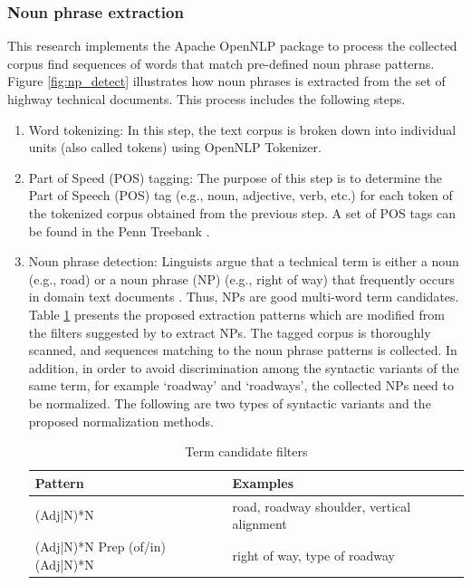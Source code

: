 \documentclass[Journal,InsideFigs, DoubleSpace]{ascelike} %
\begin{document}
\subsubsection{Noun phrase extraction}
%
This research implements the Apache OpenNLP package to process the collected corpus find sequences of words that match pre-defined noun phrase patterns. Figure \ref{fig:np_detect} illustrates how noun phrases is extracted from the set of highway technical documents. This process includes the following steps. %
\begin{enumerate} [label=\roman*]
\item Word tokenizing: In this step, the text corpus is broken down into individual units (also called tokens) using OpenNLP Tokenizer.
\item Part of Speed (POS) tagging: The purpose of this step is to determine the Part of Speech (POS) tag (e.g., noun, adjective, verb, etc.) for each token of the tokenized corpus obtained from the previous step. A set of POS tags can be found in the Penn Treebank \cite{marcus93}.
\item Noun phrase detection: Linguists argue that a technical term is either a noun (e.g., road) or a noun phrase (NP) (e.g., right of way) that frequently occurs in domain text documents \cite{justeson95}. Thus, NPs are good multi-word term candidates. Table \ref{table:term_filter} presents the proposed extraction patterns which are modified from the filters suggested by  to extract NPs. The tagged corpus is thoroughly scanned, and sequences matching to the noun phrase patterns is collected. 
In addition, in order to avoid discrimination among the syntactic variants of the same term, for example `roadway' and `roadways', the collected NPs need to be normalized. The following are two types of syntactic variants and the proposed normalization methods.
\begin{table} [t]
		\caption{Term candidate filters}
		\label{table:term_filter}
		\centering
		\small
		\renewcommand{\arraystretch}{1.25}
		\begin{tabular}{l l}
			\hline
			\textbf{Pattern} & \textbf{Examples}\\
			\hline
			(Adj|N)*N		& road, roadway shoulder, vertical alignment\\
			(Adj|N)*N Prep (of/in) (Adj|N)*N	&	right of way, type of roadway\\

\end{tabular}
\end{table}
\end{enumerate}
\end{document}
